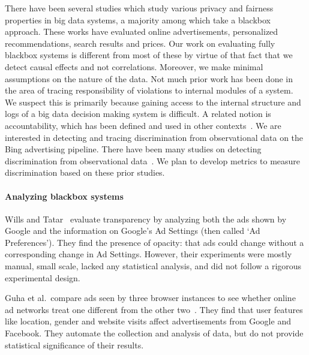 \documentclass[10pt, onecolumn]{report}
\begin{document}
There have been several studies which study various privacy and fairness
properties in big data systems, a majority among which take a blackbox
approach. These works have evaluated online advertisements, personalized
recommendations, search results and prices\cite{wills12wpes, guha10imc, 
sweeney13cacm, lecuyer14usenix, lecuyer2015sunlight, 
hannak2013measuring, hannak2014measuring}. Our work on evaluating
fully blackbox systems is different from most of these by
virtue of that fact that we detect causal effects and not correlations. Moreover, 
we make minimal assumptions on the nature of the data. 
Not much prior work has been done in the area of tracing responsibility of violations
to internal modules of a system. We suspect this is primarily because gaining 
access to the internal structure and logs of a big data decision making
system is difficult. A related notion is accountability, which has been defined and used in
other contexts~\cite{kuesters10ccs, backes2006compositional,
datta2015program}. We are interested in detecting and tracing discrimination 
from observational data on the Bing advertising pipeline. 
There have been many studies on detecting discrimination
from observational data~\cite{pedreshi08discrimination, hajian13methodology, 
ruggieri10data, luong11k, tramer15fairtest}. We plan to develop metrics to
measure discrimination based on these prior studies. 

\paragraph{Analyzing blackbox systems}
Wills and Tatar~\cite{wills12wpes} evaluate transparency by analyzing both the 
ads shown by Google and the information on Google's Ad Settings 
(then called `Ad Preferences'). They find the presence of 
opacity: that ads could change without a corresponding change in Ad Settings. 
However, their experiments were mostly manual, small scale, 
lacked any statistical analysis, and did not follow a rigorous experimental design.  

Guha et al.\ compare ads seen by three browser instances 
to see whether online ad networks treat one 
different from the other two~\cite{guha10imc}. They find that user features like
location, gender and website visits affect advertisements from Google and Facebook.
They automate the collection and analysis of data, but do not provide statistical
significance of their results. 
\end{document}

